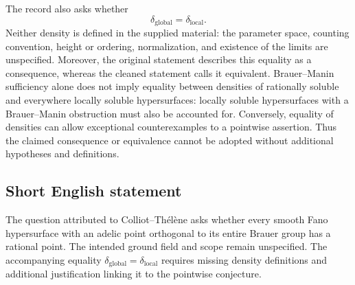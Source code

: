 \documentclass[11pt]{article}
\begin{document}
The record also asks whether
\[
\delta_{\mathrm{global}}=\delta_{\mathrm{local}}.
\]
Neither density is defined in the supplied material: the parameter space, counting convention, height or ordering, normalization, and existence of the limits are unspecified. Moreover, the original statement describes this equality as a consequence, whereas the cleaned statement calls it equivalent. Brauer--Manin sufficiency alone does not imply equality between densities of rationally soluble and everywhere locally soluble hypersurfaces: locally soluble hypersurfaces with a Brauer--Manin obstruction must also be accounted for. Conversely, equality of densities can allow exceptional counterexamples to a pointwise assertion. Thus the claimed consequence or equivalence cannot be adopted without additional hypotheses and definitions.
\subsection{Short English statement}
The question attributed to Colliot--Th\'el\`ene asks whether every smooth Fano hypersurface with an adelic point orthogonal to its entire Brauer group has a rational point. The intended ground field and scope remain unspecified. The accompanying equality \(\delta_{\mathrm{global}}=\delta_{\mathrm{local}}\) requires missing density definitions and additional justification linking it to the pointwise conjecture.
\end{document}
